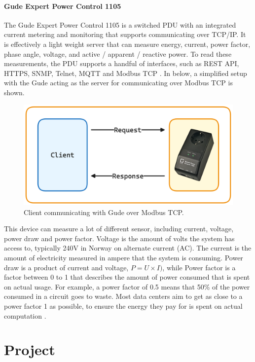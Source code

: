 \documentclass[
  table]{report}
\begin{document}
\subsection{Gude Expert Power Control 1105}

The Gude Expert Power Control 1105 is a switched PDU with an integrated
current metering and monitoring that supports communicating over TCP/IP.
It is effectively a light weight server that can measure energy,
current, power factor, phase angle, voltage, and active / apparent /
reactive power. To read these measurements, the PDU supports a handful
of interfaces, such as REST API, HTTPS, SNMP, Telnet, \ac{MQTT} and
Modbus TCP \citep{gmbhExpertPowerControl2023}. In
 below, a simplified setup with the Gude acting
as the server for communicating over Modbus TCP is shown.

\begin{figure}[H]
\centering
  \includegraphics[width=0.7\columnwidth]{assets/3-modbus-gude.png}
  \caption{Client communicating with Gude over Modbus TCP.}
  \label{fig:gude-control}
\end{figure}

This device can measure a lot of different sensor, including current,
voltage, power draw and power factor. Voltage is the amount of volts the
system has access to, typically 240V in Norway on alternate current
(AC). The current is the amount of electricity measured in ampere that
the system is consuming. Power draw is a product of current and voltage,
\(P = U \times I)\), while Power factor is a factor between 0 to 1 that
describes the amount of power consumed that is spent on actual usage.
For example, a power factor of 0.5 means that 50\% of the power consumed
in a circuit goes to waste. Most data centers aim to get as close to a
power factor 1 as possible, to ensure the energy they pay for is spent
on actual computation \citep{rasmussenImpactLeadingPower2020}.

\part{Project}
\end{document}
